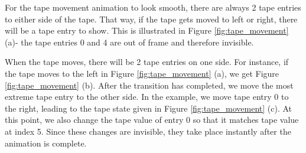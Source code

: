 For the tape movement animation to look smooth, there are always 2 tape entries to either side of the tape. That way, if the tape gets moved to left or right, there will be a tape entry to show. This is illustrated in Figure \ref{fig:tape_movement} (a)- the tape entries 0 and 4 are out of frame and therefore invisible. 

When the tape moves, there will be 2 tape entries on one side. For instance, if the tape moves to the left in Figure \ref{fig:tape_movement} (a), we get Figure \ref{fig:tape_movement} (b). After the transition has completed, we move the most extreme tape entry to the other side. In the example, we move tape entry 0 to the right, leading to the tape state given in Figure \ref{fig:tape_movement} (c). At this point, we also change the tape value of entry 0 so that it matches tape value at index 5. Since these changes are invisible, they take place instantly after the animation is complete.
